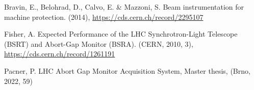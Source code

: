 {\begin{thebibliography}{99}
        Bravin, E., Belohrad, D., Calvo, E. \& Mazzoni, S. Beam
            instrumentation for machine protection.  (2014), \url{https://cds.cern.ch/record/2295107}

        Fisher, A. Expected Performance of the LHC
            Synchrotron-Light Telescope (BSRT) and Abort-Gap Monitor (BSRA).
            (CERN, 2010, 3), \url{https://cds.cern.ch/record/1261191}

        Pacner, P. LHC Abort Gap Monitor
            Acquisition System, Master thesis, (Brno, 2022, 59)

% 

    \end{thebibliography}
} %
